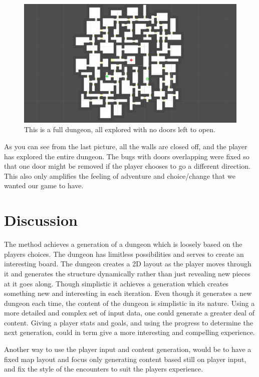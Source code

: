 \documentclass[conference,compsoc]{IEEEtran}
\begin{document}
\begin{figure}[h]
	\graphicspath{{figures/}}
	\includegraphics[width = \columnwidth ]{BigDungeon2.png}
	\caption{This is a full dungeon, all explored with no doors left to open.}
	\label{fig:finishDung}
\end{figure}
As you can see from the last picture, all the walls are closed off, and the player has explored the entire dungeon. The bugs with doors overlapping were fixed so that one door might be removed if the player chooses to go a different direction. This also only amplifies the feeling of adventure and choice/change that we wanted our game to have.
\section{Discussion}
The method achieves a generation of a dungeon which is loosely based on the players choices. The dungeon has limitless possibilities and serves to create an interesting board. 
The dungeon creates a 2D layout as the player moves through it and generates the structure dynamically rather than just revealing new pieces at it goes along. Though simplistic it achieves a generation which creates something new and interesting in each iteration.
Even though it generates a new dungeon each time, the content of the dungeon is simplistic in its nature. Using a more detailed and complex set of input data, one could generate a greater deal of content. Giving a player stats and goals, and using the progress to determine the next generation, could in term give a more interesting and compelling experience. 

Another way to use the player input and content generation, would be to have a fixed map layout and focus only generating content based still on player input, and fix the style of the encounters to suit the players experience.
\end{document}

